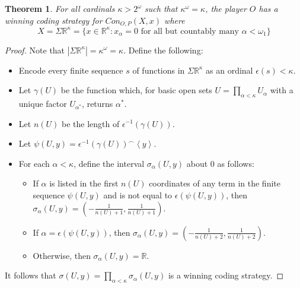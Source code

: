 \documentclass[11pt]{article}
\theoremstyle{plain}
\newtheorem{theorem}{Theorem}
\theoremstyle{definition}
\theoremstyle{remark}
\begin{document}
\begin{theorem}
For all cardinals $\kappa>2^\omega$ such that $\kappa^\omega = \kappa$, the player $O$ has a winning coding strategy for $Con_{O,P}(X,x)$ where \[X=\Sigma\mathbb{R}^{\kappa}=\{x\in \mathbb{R}^{\kappa}: x_\alpha = 0 \text{ for all but countably many } \alpha<\omega_1\}\]
\end{theorem}

\begin{proof}
Note that $|\Sigma\mathbb{R}^\kappa| = \kappa^\omega = \kappa$. Define the following:

    \begin{itemize}
    \item Encode every finite sequence $s$ of functions in $\Sigma\mathbb{R}^{\kappa}$ as an ordinal $\epsilon(s)<\kappa$. 
    \item Let $\gamma(U)$ be the function which, for basic open sets $U=\prod_{\alpha<\kappa}U_\alpha$ with a unique factor $U_{\alpha^*}$, returns $\alpha^*$.
    \item Let $n(U)$ be the length of $\epsilon^{-1}(\gamma(U))$.
    \item Let $\psi(U,y)=\epsilon^{-1}(\gamma(U))^\frown\left<y\right>$.
    \item For each $\alpha<\kappa$, define the interval $\sigma_\alpha(U,y)$ about $0$ as follows:
        \begin{itemize}
        \item If $\alpha$ is listed in the first $n(U)$ coordinates of any term in the finite sequence $\psi(U,y)$ and is not equal to $\epsilon(\psi(U,y))$, then $\sigma_\alpha(U,y)=(-\frac{1}{n(U)+1},\frac{1}{n(U)+1})$.
        \item If $\alpha=\epsilon(\psi(U,y))$, then $\sigma_\alpha(U,y)=(-\frac{1}{n(U)+2},\frac{1}{n(U)+2})$.
        \item Otherwise, then $\sigma_\alpha(U,y)=\mathbb{R}$.
        \end{itemize}
    \end{itemize}

It follows that $\sigma(U,y)=\prod_{\alpha<\kappa} \sigma_\alpha(U,y)$ is a winning coding strategy.
\end{proof}
\end{document}
